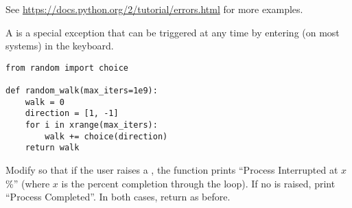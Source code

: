 \begin{comment} %
An exception that is caught by an \li{except} statement can be captured as a variable within the \li{except} block if it is declared using the keyword \li{as}.

\begin{lstlisting}
# Catch only a specific class of exceptions.
>>> try:
...     bad = 100 / 0
... except ZeroDivisionError as e:
...     print(e)
... 
<<integer division or modulo by zero>>

# Here a different exception is raised than the one in the except statement.
>>> try:
...     1 + 'a' + 2 + 'b' + 3
... except ValueError as e:
...     print(e)
<<Traceback (most recent call last):
  File "<stdin>", line 2, in <module>
TypeError: unsupported operand type(s) for +: 'int' and 'str'>>

>>> try:
...     import magic
... except ImportError as e:
...     print "Sorry!", e
... 
Sorry! No module named magic
\end{lstlisting}

Multiple kinds of exceptions can be caught by a single \li{except} statement using a parenthesized list of exceptions.
There can also be more than one \li{except} statements corresponding to a single \li{try} statement, each indicating which exception class(es) to catch.
An \li{else} statement can also be attached after \li{except} statements, which is only executed if the \li{try} block is executed to completion.
\end{comment}

See \url{https://docs.python.org/2/tutorial/errors.html} for more examples.

\begin{problem} %
A  is a special exception that can be triggered at any time by entering  (on most systems) in the keyboard.

\begin{lstlisting}
from random import choice

def random_walk(max_iters=1e9):
    walk = 0
    direction = [1, -1]
    for i in xrange(max_iters):
        walk += choice(direction)
    return walk
\end{lstlisting}
Modify  so that if the user raises a , the function prints ``Process Interrupted at $x$\%'' (where $x$ is the percent completion through the loop).
If no  is raised, print ``Process Completed''.
In both cases, return  as before.
\end{problem}

